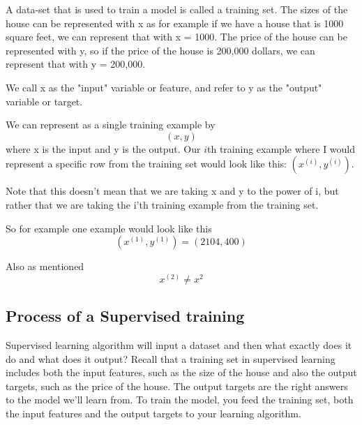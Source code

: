 A data-set that is used to train a model is called a training set. The sizes of the house can be represented with x as for example if we  have a house that is 1000 square feet, we can represent that with x = 1000. The price of the house can be represented with y, so if the price of the house is 200,000 dollars, we can represent that with y = 200,000. 

We call x as the "input" variable or feature, and refer to y as the "output" variable or target. 

We can represent as a single training example by $$(x,y)$$ where x is the input and y is the output.
Our $i$th training example where I would represent a specific row from the training set would look like this: $(x^{(i)},y^{(i)})$.

Note that this doesn't mean that we are taking x and y to the power of i, but rather that we are taking the i'th training example from the training set.

So for example one example would look like this $$ (x^{(1)}, y^{(1)})=(2104,400) $$

Also as mentioned $$x^{(2)}\neq x^2$$

\subsection{Process of a Supervised training}
Supervised learning algorithm will input a dataset and then what exactly does it do and what does it output? 
Recall that a training set in supervised learning includes both the input features, such as the size of the house and also the output targets, such as the price of the house. The output targets are the right answers to the model we'll learn from.
To train the model, you feed the training set, both the input features and the output targets to your learning algorithm. 